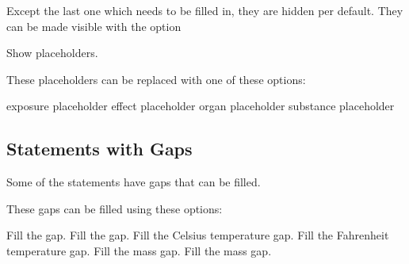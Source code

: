 \documentclass[load-preamble+]{cnltx-doc}
\begin{document}
Except the last one which needs to be filled in, they are hidden per default.
They can be made visible with the option
\begin{options}
    Show placeholders.
\end{options}
\begin{example}
   \par
   \par
   \par
   \par
   \par
   \par
   \par
\end{example}

These placeholders can be replaced with one of these options:
\begin{options}
  \Default
    exposure placeholder
  \Default
    effect placeholder
  \Default
    organ placeholder
  \Default
    substance placeholder
\end{options}
\begin{example}
   \par
   \par
   \par
\end{example}

\subsection{Statements with Gaps}
Some of the statements have gaps that can be filled.
\begin{example}
   \par
   \par
   \par
\end{example}

These gaps can be filled using these options:
\begin{options}
    Fill the  gap.
    Fill the  gap.
    Fill the Celsius temperature gap.
    Fill the Fahrenheit temperature gap.
    Fill the \si{\GHSkilogram} mass gap.
    Fill the \si{\GHSpounds} mass gap.
\end{options}
\begin{example}
   \par
   \par
   \par
\end{example}
\end{document}

